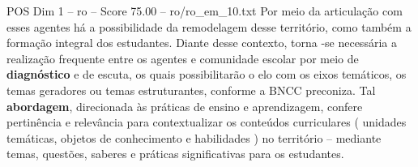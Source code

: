 \begin{textsample}{POS Dim 1 – ro – Score 75.00 – ro/ro\_em\_10.txt}
Por meio da articulação com esses agentes há a possibilidade da remodelagem desse território, como também a formação integral dos estudantes.
Diante desse contexto, torna -se necessária a realização frequente entre os agentes e comunidade escolar por meio de \textbf{diagnóstico} e de escuta, os quais possibilitarão o elo com os eixos temáticos, os temas geradores ou temas estruturantes, conforme a BNCC preconiza.
Tal \textbf{abordagem}, direcionada às práticas de ensino e aprendizagem, confere pertinência e relevância para contextualizar os conteúdos curriculares ( unidades temáticas, objetos de conhecimento e habilidades ) no território – mediante temas, questões, saberes e práticas significativas para os estudantes.

\end{textsample}
